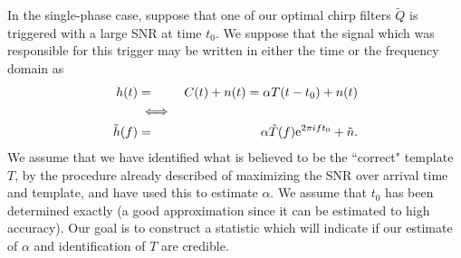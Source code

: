 In the single-phase case, suppose that one of our optimal chirp filters
$\tilde Q$ is triggered with a large SNR at time $t_0$.  We suppose
that the signal which was responsible for this trigger may be written
in either the time or the frequency domain as
\begin{eqnarray}
\nonumber
h(t) & = & C(t) + n(t) = \alpha T(t-t_0) + n(t) \\
\nonumber
 & \iff & \\
\tilde h(f) & = & \alpha \tilde T(f) {\rm e}^{2 \pi i f t_0} + \tilde n.
\end{eqnarray}
We assume that we have identified what is believed to be the ``correct"
template $T$, by the procedure already described of maximizing the SNR
over arrival time and template, and have used this to estimate $\alpha$.
We assume that $t_0$ has been determined exactly (a good approximation
since it can be estimated to high accuracy).  Our goal is to construct
a statistic which will indicate if our estimate of $\alpha $ and
identification of $T$ are credible.

